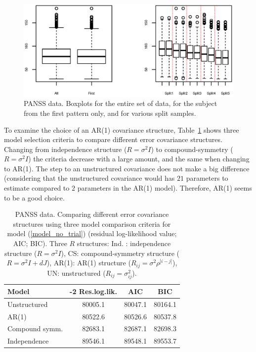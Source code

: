 \documentclass[11pt,a5paper,twoside]{book}
\begin{document}
{\begin{figure}[ht]
\centering
\includegraphics[trim=2cm 5cm 2cm 5cm,scale=1]{all_first.eps}
\caption{PANSS data. Boxplots for the entire set of data, for the subject from the first pattern only, and for various split samples. } \label{fig_all_first}
\end{figure}

To examine the choice of an AR(1) covariance structure, Table~\ref{fig_model_comp} shows three model selection criteria  to compare different error covariance structures. Changing from independence structure ($R=\sigma^2 I$) to compound-symmetry ($R=\sigma^2 I$) the criteria decrease with a large amount, and the same when changing to AR(1). The step to an unstructured covariance does not make a big difference (considering that the unstructured covariance would has $21$ parameters to estimate compared to $2$ parameters in the AR(1) model). Therefore, AR(1) seems to be a good choice.

\begin{table}[t]
\centering
\caption[PANSS data. Comparing different error covariance structures using three model comparison criteria for without trial model]{PANSS data. Comparing different error covariance structures using three model comparison criteria for model (\ref{model_no_trial}) (residual log-likelihood value; AIC; BIC). Three $R$ structures: Ind. : independence structure ($R=\sigma^2 I$), CS: compound-symmetry structure ($R= \sigma^2 I +dJ $), AR(1): AR(1) structure ($R_{ij}=\sigma^2 \rho^{|i-j|}$), UN: unstructured ($R_{ij}=\sigma^2_{ij}$).} \label{fig_model_comp}

\begin{tabular}{lccc}
\hline
\hline
Model&-2 Res.log.lik.&AIC&BIC\\
\hline
Unstructured  &80005.1&80047.1&80164.1\\
AR(1)         &80522.6&80526.6&80537.8\\
Compound symm.&82683.1&82687.1&82698.3\\
Independence  &89546.1&89548.1&89553.7\\
\hline\hline
\end{tabular}
\end{table}

}
\end{document}
